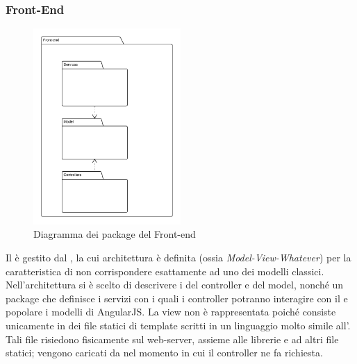 \subsubsection{Front-End}

\begin{figure}[H]
\centering
\includegraphics[width=0.5\textwidth]{uml/Front-end-Diagramma dei packages.png}
\caption{Diagramma dei package del Front-end}
\end{figure}

Il  è gestito dal  , la cui architettura è definita  (ossia \textit{Model-View-Whatever}) per la caratteristica di non corrispondere esattamente ad uno dei modelli classici. Nell'architettura si è scelto di descrivere i  del controller e del model, nonché un package che definisce i servizi con i quali i controller potranno interagire con il  e popolare i modelli di AngularJS. La view non è rappresentata poiché consiste unicamente in dei file statici di template scritti in un linguaggio molto simile all'. Tali file risiedono fisicamente sul web-server, assieme alle librerie  e ad altri file statici; vengono caricati da  nel momento in cui il controller ne fa richiesta.